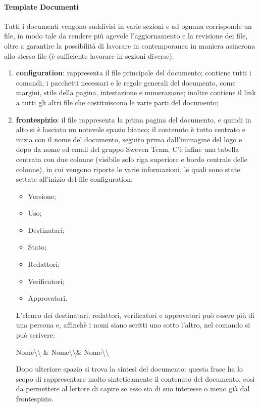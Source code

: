 \paragraph{Template Documenti}
Tutti i documenti vengono suddivisi in varie sezioni e ad ognuna corrisponde 
un file, in modo tale da rendere più agevole l'aggiornamento e la revisione dei file, 
oltre a garantire la possibilità di lavorare in contemporanea in maniera 
asincrona allo stesso file (è sufficiente lavorare in sezioni diverse).
\begin{enumerate}
    \item \textbf{configuration}:
            rappresenta il file principale del documento; contiene tutti i comandi, 
            i pacchetti necessari e le regole generali del documento, come 
            margini, stile della pagina, intestazione e numerazione; 
            inoltre contiene il link a tutti gli altri file che costituiscono le 
            varie parti del documento;

    \item \textbf{frontespizio}:
            il file rappresenta la prima pagina del documento, e quindi in alto si
            è lasciato un notevole spazio bianco; il contenuto è tutto centrato e 
            inizia con il nome del documento, seguito prima dall'immagine del logo e dopo da nome ed email del gruppo Sweven Team. C'è infine una tabella centrata 
            con due colonne (visibile solo riga superiore e bordo centrale delle colonne), 
            in cui vengono riporte le varie informazioni, le quali sono state settate all'inizio 
            del file configuration:
            \begin{itemize}
                \item Versione;
                \item Uso;
                \item Destinatari;
                \item Stato;
                \item Redattori;
                \item Verificatori;
                \item Approvatori.
            \end{itemize}
            L'elenco dei destinatari, redattori, verificatori e approvatori 
            può essere più di una persona e, affinchè i nomi siano scritti uno sotto 
            l'altro, nel comando si può scrivere: 
            \begin{center}
            	Nome\textbackslash\textbackslash 
            	\& Nome\textbackslash\textbackslash \& Nome\textbackslash\textbackslash
            \end{center}
            Dopo ulteriore spazio si trova la sintesi del documento: questa frase
            ha lo scopo di rappresentare molto sinteticamente il contenuto del documento, 
            così da permettere al lettore di capire se esso sia di suo interesse o meno già dal frontespizio.
    

\end{enumerate}
